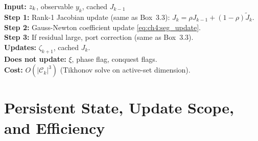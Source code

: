 \begin{mdframed}[linecolor=violet!60!black, linewidth=1pt,
                 frametitle={\small\sffamily\bfseries
                 Procedure 4.3: \textsc{SegmentUpdate} (Loop~1)}]
\label{proc:ch4:segment}
\textbf{Input:} $z_k$, observable $y_k$, cached $J_{k-1}$\\
\textbf{Step 1:} Rank-1 Jacobian update (same as Box~3.3):
$J_k = \rho J_{k-1} + (1-\rho)\tilde{J}_k.$\\
\textbf{Step 2:} Gauss-Newton coefficient update \eqref{eq:ch4:seg_update}.\\
\textbf{Step 3:} If residual large, port correction (same as Box~3.3).\\
\textbf{Updates:} $\zeta_{k+1}$, cached $J_k$.\\
\textbf{Does not update:} $\xi$, phase flag, conquest flags.\\
\textbf{Cost:} $O(|\mathcal{C}_k|^3)$ (Tikhonov solve on active-set dimension).
\end{mdframed}

\section{Persistent State, Update Scope, and Efficiency}
\label{sec:ch4:efficiency}

